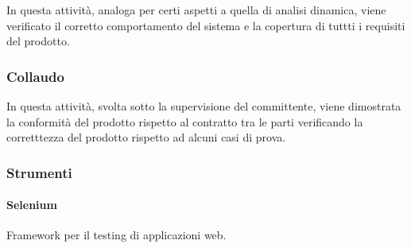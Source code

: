 In questa attività, analoga per certi aspetti a quella di analisi dinamica, viene verificato il corretto comportamento del sistema e la 
copertura di tuttti i requisiti del prodotto.

\subsubsection{Collaudo}
\label{ssub:validazione:collaudo}

In questa attività, svolta sotto la supervisione del committente, viene dimostrata la conformità del prodotto rispetto al contratto tra le 
parti verificando la corretttezza del prodotto rispetto ad alcuni casi di prova.

\subsubsection{Strumenti}
\label{ssub:validazione:strumenti}

\paragraph{Selenium}
\label{par:verifica:selenium}

Framework per il testing di applicazioni web.
